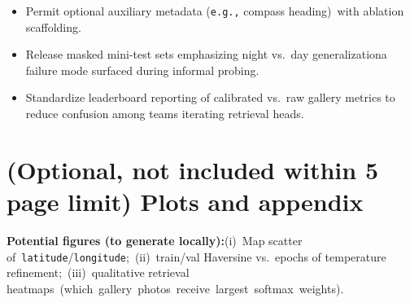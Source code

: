 \documentclass[10pt]{article}
\begin{document}
\begin{itemize}[leftmargin=1.25em]
\item Permit optional auxiliary metadata (\texttt{e.g.,} compass heading)\ with ablation scaffolding.
\item Release masked mini-test sets emphasizing night vs.\ day generalization\textemdash a failure mode surfaced during informal probing.
\item Standardize leaderboard reporting of calibrated vs.\ raw gallery metrics to reduce confusion among teams iterating retrieval heads.
\end{itemize}

\section{(Optional, not included within 5 page limit) Plots and appendix}

\textbf{Potential figures (to generate locally):}(i)~Map scatter of~\texttt{latitude}/\texttt{longitude};~(ii)~train/val Haversine vs.\ epochs of temperature refinement;~(iii)~qualitative retrieval heatmaps~\mbox{(which gallery photos receive largest softmax weights)}.
\end{document}

